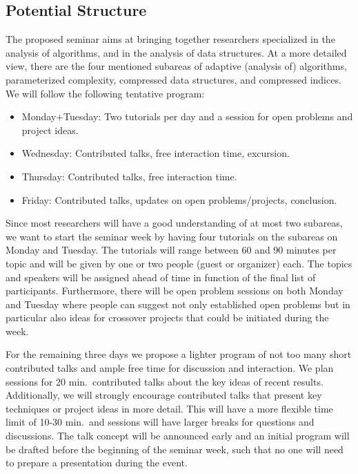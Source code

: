\documentclass[a4paper,10pt]{article}
\begin{document}

\subsection{Potential Structure}

The proposed seminar aims at bringing together researchers specialized in the analysis of algorithms, and in the analysis of data structures. At a more detailed view, there are the four mentioned subareas of adaptive (analysis of) algorithms, parameterized complexity, compressed data structures, and compressed indices. We will follow the following tentative program:
\begin{itemize}
 \item Monday+Tuesday: Two tutorials per day and a session for open problems and project ideas.
 \item Wednesday: Contributed talks, free interaction time, excursion.
 \item Thursday: Contributed talks, free interaction time.
 \item Friday: Contributed talks, updates on open problems/projects, conclusion.
\end{itemize}

Since most researchers will have a good understanding of at most two subareas, we want to start the seminar week by having four tutorials on the subareas on Monday and Tuesday. The tutorials will range between 60 and 90 minutes per topic and will be given by one or two people (guest or organizer) each. The topics and speakers will be assigned ahead of time in function of the final list of participants. Furthermore, there will be open problem sessions on both Monday and Tuesday where people can suggest not only established open problems but in particular also ideas for crossover projects that could be initiated during the week.

For the remaining three days we propose a lighter program of not too many short contributed talks and ample  free time for discussion and interaction. We plan sessions for 20 min.\ contributed talks about the key ideas of recent results. Additionally, we will strongly encourage contributed talks that present key techniques or project ideas in more detail. This will have a more flexible time limit of 10-30 min.\ and sessions will have larger breaks for questions and discussions. The talk concept will be announced early and an initial program will be drafted before the beginning of the seminar week, such that no one will need to  prepare a presentation during the event.
\end{document}
